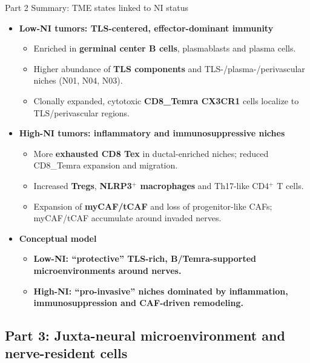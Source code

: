 \documentclass[10pt]{beamer}
\theoremstyle{plain}
\begin{document}
\begin{frame}{Part 2 Summary: TME states linked to NI status}
  \begin{itemize}
    \item \textbf{Low-NI tumors: TLS-centered, effector-dominant immunity}
      \begin{itemize}
        \item Enriched in \textbf{germinal center B cells}, plasmablasts and plasma cells.
        \item Higher abundance of \textbf{TLS components} and TLS-/plasma-/perivascular niches (N01, N04, N03).
        \item Clonally expanded, cytotoxic \textbf{CD8\_Temra CX3CR1} cells localize to TLS/perivascular regions.
      \end{itemize}

    \item \textbf{High-NI tumors: inflammatory and immunosuppressive niches}
      \begin{itemize}
        \item More \textbf{exhausted CD8 Tex} in ductal-enriched niches; reduced CD8\_Temra expansion and migration.
        \item Increased \textbf{Tregs}, \textbf{NLRP3\(^{+}\) macrophages} and Th17-like CD4\(^{+}\) T cells.
        \item Expansion of \textbf{myCAF/tCAF} and loss of progenitor-like CAFs; myCAF/tCAF accumulate around invaded nerves.
      \end{itemize}
    \item \textbf{Conceptual model}
      \begin{itemize}
        \item \textbf{Low-NI: ``protective'' TLS-rich, B/Temra-supported microenvironments around nerves.}
        \item \textbf{High-NI: ``pro-invasive'' niches dominated by inflammation, immunosuppression and CAF-driven remodeling.}
      \end{itemize}
  \end{itemize}
\end{frame}

\subsection{Part 3: Juxta-neural microenvironment and nerve-resident cells}
\end{document}
